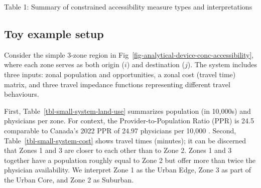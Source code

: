 \documentclass[
  10pt,
  letterpaper,
]{article}
\newcommand{\blandscape}{\begin{landscape}}
\newcommand{\elandscape}{\end{landscape}}
\begin{document}
\blandscape

Table 1: Summary of constrained accessibility measure types and
interpretations



\elandscape

\subsection{Toy example setup}\label{toy-example-setup}

Consider the simple 3-zone region in
Fig~\ref{fig-analytical-device-conc-accessibility}, where each zone
serves as both origin (\(i\)) and destination (\(j\)). The system
includes three inputs: zonal population and opportunities, a zonal cost
(travel time) matrix, and three travel impedance functions representing
different travel behaviours.

First, Table~\ref{tbl-small-system-land-use} summarizes population (in
10,000s) and physicians per zone. For context, the
Provider-to-Population Ratio (PPR) is 24.5 comparable to Canada's 2022
PPR of 24.97 physicians per 10,000 \citep{whoMedicalDoctors102025}.
Second, Table~\ref{tbl-small-system-cost} shows travel times (minutes);
it can be discerned that Zones 1 and 3 are closer to each other than to
Zone 2. Zones 1 and 3 together have a population roughly equal to Zone 2
but offer more than twice the physician availability. We interpret Zone
1 as the Urban Edge, Zone 3 as part of the Urban Core, and Zone 2 as
Suburban.

\begin{table}

\caption{\label{tbl-small-system-land-use}Simple system with three zones
(ID 1, 2 and 3). Population is in 10,000 persons and opportunities in
number of physicians.}


\end{table}%
\end{document}
